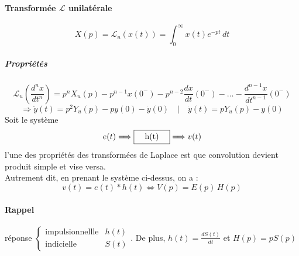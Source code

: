 \paragraph{Transformée $\mathcal{L}$ unilatérale}
$$X(p)=\text{$\mathbf{\mathcal{L}}$}_u(x(t))=\int_{0}^{\infty}x(t)e^{-pt}\,dt$$
\subparagraph{Propriétés}
$$\mathcal{L}_u\left(\frac{d^nx}{dt^n}\right)=p^nX_u(p)-p^{n-1}x(0^-)-p^{n-2}\frac{dx}{dt}(0^-)-\dots-\frac{d^{n-1}x}{dt^{n-1}}(0^-)$$
$$\Rightarrow \ddot{y}(t)=p^2Y_u(p)-py(0)-\dot y(0)\quad|\quad\dot y(t)=pY_u(p)-y(0)$$
Soit le système
$$e(t)\Longrightarrow \fbox{\quad h(t)\quad}\Longrightarrow v(t)$$
l'une des propriétés des transformées de Laplace est que convolution devient produit simple et vise versa.\\
Autrement dit, en prenant le système ci-dessus, on a : 
$$v(t)=e(t)*h(t)\Leftrightarrow V(p) = E(p)\,H(p)$$
\paragraph{Rappel} réponse $\left\{\begin{array}{ll}
\text{impulsionnellle} & h(t)\\
\text{indicielle} & S(t)
\end{array}\right.$. De plus,  $h(t)=\frac{dS(t)}{dt}$ et  $H(p)=pS(p)$\\

